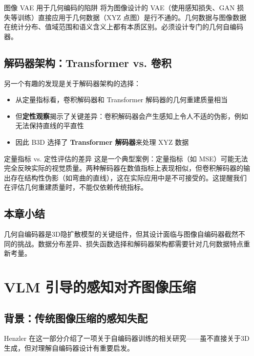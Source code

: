 \documentclass[a4paper]{article}
\begin{document}
\begin{warningbox}{图像 VAE 用于几何编码的陷阱}
将为图像设计的 VAE（使用感知损失、GAN 损失等训练）直接应用于几何数据（XYZ 点图）是行不通的。几何数据与图像数据在统计分布、值域范围和语义含义上都有本质区别。必须设计专门的几何自编码器。
\end{warningbox}

\subsection{解码器架构：Transformer vs. 卷积}

另一个有趣的发现是关于解码器架构的选择：

\begin{itemize}
    \item 从定量指标看，卷积解码器和 Transformer 解码器的几何重建质量相当
    \item 但\textbf{定性观察}揭示了关键差异：卷积解码器会产生感知上令人不适的伪影，例如无法保持直线的平直性
    \item 因此 B3D 选择了 \textbf{Transformer 解码器}来处理 XYZ 数据
\end{itemize}

\begin{warningbox}{定量指标 vs. 定性评估的差异}
这是一个典型案例：定量指标（如 MSE）可能无法完全反映实际的视觉质量。两种解码器在数值指标上表现相似，但卷积解码器的输出存在结构性伪影（如弯曲的直线），这在实际应用中是不可接受的。这提醒我们在评估几何重建质量时，不能仅依赖传统指标。
\end{warningbox}

\subsection{本章小结}

几何自编码器是3D隐扩散模型的关键组件，但其设计面临与图像自编码器截然不同的挑战。数据分布差异、损失函数选择和解码器架构都需要针对几何数据特点重新考量。

\section{VLM 引导的感知对齐图像压缩}

\subsection{背景：传统图像压缩的感知失配}

Henzler 在这一部分介绍了一项关于自编码器训练的相关研究——虽不直接关于3D生成，但对理解自编码器设计有重要启发。
\end{document}
